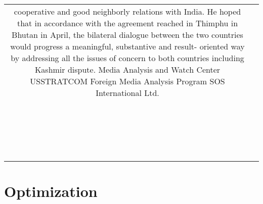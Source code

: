 \begin{table*}[t]
\begin{tabular*}{\textwidth}{c|c}
{{		cooperative and good neighborly relations with India.
		He hoped that in accordance with the agreement reached in Thimphu in Bhutan in April, the
		bilateral dialogue between the two countries would progress a meaningful, substantive and
		result- oriented way by addressing all the issues of concern to both countries including
		Kashmir dispute.
		Media Analysis and Watch Center
		USSTRATCOM Foreign Media Analysis Program
		SOS International Ltd.
         }} \\ 
        &    \\
        &    \\
        &    \\
        &    \\
        &    \\
        &    \\
        &    \\
        &    \\
        &    \\
        &    \\
        &    \\
        &    \\
        &    \\
        &    \\
        &    \\
        &    \\
        &    \\
        &    \\
        &    \\
        &    \\
	    \bottomrule
	\end{tabular*}
	\label{tab:email}
\end{table*}


\section{Optimization}
